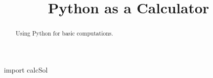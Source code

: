 \documentclass{ximera}
\title{Python as a Calculator}
\begin{document}
  
\begin{abstract}  
Using Python for basic computations.
\end{abstract}  
\maketitle

\begin{sageCell}
import calcSol
\end{sageCell}
\end{document}
